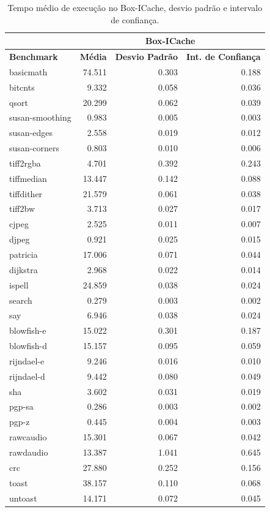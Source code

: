 \documentclass[11pt,twoside]{article}
\begin{document}
\begin{table}
 \caption{Tempo médio de execução no Box-ICache, desvio padrão e intervalo de confiança.}
 \begin{center}
 \begin{tabular}{|l|r|r|r|}
   \cline{2-4}
   \multicolumn{1}{c|}{}& \multicolumn{3}{|c|}{Box-ICache} \\ \hline
   \bf{Benchmark} & \bf{Média} & \bf{Desvio Padrão} & \bf{Int. de Confiança} \\ \hline
   basicmath & 74.511 & 0.303 & 0.188\\ \hline 
   bitcnts & 9.332 & 0.058 & 0.036\\ \hline 
   qsort & 20.299 & 0.062 & 0.039\\ \hline 
   susan-smoothing & 0.983 & 0.005 & 0.003\\ \hline 
   susan-edges & 2.558 & 0.019 & 0.012\\ \hline 
   susan-corners & 0.803 & 0.010 & 0.006\\ \hline 
   tiff2rgba & 4.701 & 0.392 & 0.243\\ \hline 
   tiffmedian & 13.447 & 0.142 & 0.088\\ \hline 
   tiffdither & 21.579 & 0.061 & 0.038\\ \hline 
   tiff2bw & 3.713 & 0.027 & 0.017\\ \hline 
   cjpeg & 2.525 & 0.011 & 0.007\\ \hline 
   djpeg & 0.921 & 0.025 & 0.015\\ \hline 
   patricia & 17.006 & 0.071 & 0.044\\ \hline 
   dijkstra & 2.968 & 0.022 & 0.014\\ \hline 
   ispell & 24.859 & 0.038 & 0.024\\ \hline 
   search & 0.279 & 0.003 & 0.002\\ \hline 
   say & 6.946 & 0.038 & 0.024\\ \hline 
   blowfish-e & 15.022 & 0.301 & 0.187\\ \hline 
   blowfish-d & 15.157 & 0.095 & 0.059\\ \hline 
   rijndael-e & 9.246 & 0.016 & 0.010\\ \hline 
   rijndael-d & 9.442 & 0.080 & 0.049\\ \hline 
   sha & 3.602 & 0.031 & 0.019\\ \hline 
   pgp-sa & 0.286 & 0.003 & 0.002\\ \hline 
   pgp-z & 0.445 & 0.004 & 0.003\\ \hline 
   rawcaudio & 15.301 & 0.067 & 0.042\\ \hline 
   rawdaudio & 13.387 & 1.041 & 0.645\\ \hline 
   crc & 27.880 & 0.252 & 0.156\\ \hline 
   toast & 38.157 & 0.110 & 0.068\\ \hline 
   untoast & 14.171 & 0.072 & 0.045\\
   \hline
 \end{tabular}
 \label{tab:tempos_boxicache}
 \end{center}
\end{table}

\newpage


\end{document}
